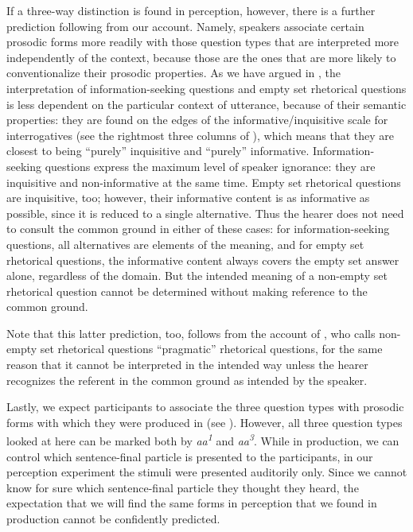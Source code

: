 \documentclass[output=paper,colorlinks,citecolor=brown            ,chinesefont]{langscibook}
\begin{document}
If a three-way distinction is found in perception, however, there is a further prediction following from our account. Namely, speakers associate certain prosodic forms more readily with those question types that are interpreted more independently of the context, because those are the ones that are more likely to conventionalize their prosodic properties. As we have argued in , the interpretation of information-seeking questions and empty set rhetorical questions is less dependent on the particular context of utterance, because of their semantic properties: they are found on the edges of the informative/inquisitive scale for interrogatives (see the rightmost three columns of ), which means that they are closest to being ``purely'' inquisitive and ``purely'' informative. Information-seeking questions express the maximum level of speaker ignorance: they are inquisitive and non-informative at the same time. Empty set rhetorical questions are inquisitive, too; however, their informative content is as informative as possible, since it is reduced to a single alternative. Thus the hearer does not need to consult the common ground in either of these cases: for information-seeking questions, all alternatives are elements of the meaning, and for empty set rhetorical questions, the informative content always covers the empty set answer alone, regardless of the domain. But the intended meaning of a non-empty set rhetorical question cannot be determined without making reference to the common ground.

Note that this latter prediction, too, follows from the account of \citet{Jamieson2018phd}, who calls non-empty set rhetorical questions ``pragmatic'' rhetorical questions, for the same reason that it cannot be interpreted in the intended way unless the hearer recognizes the referent in the common ground as intended by the speaker.

Lastly, we expect participants to associate the three question types with prosodic forms with which they were produced in \citet{Lo+2019} (see ). However, all three question types looked at here can be marked both by \textit{aa\textsuperscript{1}} and \textit{aa\textsuperscript{3}}. While in production, we can control which sentence-final particle is presented to the participants, in our perception experiment the stimuli were presented auditorily only. Since we cannot know for sure which sentence-final particle they thought they heard, the expectation that we will find the same forms in perception that we found in production cannot be confidently predicted.
\end{document}

